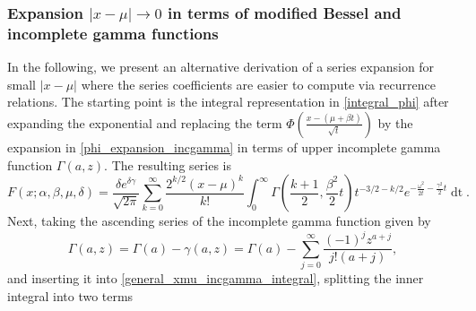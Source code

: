 \documentclass[10pt,a4paper,oneside]{article}
\numberwithin{equation}{section}
\begin{document}

\subsubsection{Expansion $|x-\mu| \to 0$ in terms of modified Bessel and incomplete gamma functions}
In the following, we present an alternative derivation of a series expansion for small $|x-\mu|$ where the series coefficients are easier to compute via recurrence relations. The starting point is the integral representation in \eqref{integral_phi} after expanding the exponential
and replacing the term $\Phi\left(\frac{x - (\mu +\beta t)}{\sqrt{t}}\right)$ by the expansion in \eqref{phi_expansion_incgamma} in terms of upper incomplete gamma function $\Gamma(a, z)$. The resulting series is
\begin{equation}\label{general_xmu_incgamma_integral}
F(x;\alpha, \beta, \mu, \delta) = \frac{\delta e^{\delta \gamma}}{\sqrt{2\pi}} \sum_{k=0}^{\infty}\frac{2^{k/2}(x-\mu)^k}{k!}\int_0^{\infty}\Gamma\left(\frac{k+1}{2}, \frac{\beta^2}{2}t\right) t^{-3/2-k/2} e^{-\frac{\omega^2}{2t} - \frac{\gamma^2}{2}t} \mathop{dt}.
\end{equation}
Next, taking the ascending series of the incomplete gamma function given by \cite[\S 8.7]{NIST:DLMF}
\begin{equation}
\Gamma(a, z) = \Gamma(a) - \gamma(a, z) = \Gamma(a) - \sum_{j=0}^{\infty} \frac{(-1)^j z^{a+j}}{j! (a+ j)},
\end{equation}
and inserting it into \eqref{general_xmu_incgamma_integral}, splitting the inner integral into two terms
\end{document}
